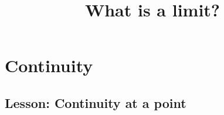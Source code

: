 \documentclass{ximera}
\title{What is a limit?}
\begin{document}
\begin{abstract}
\end{abstract}

\section{Continuity}

\subsection{Lesson: Continuity at a point}

\begin{center}
\end{center}
\end{document}

